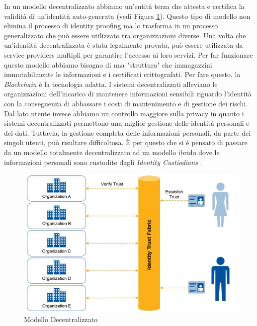 In un modello decentralizzato abbiamo un'entità terza che attesta e certifica la validità di un'identità auto-generata (vedi Figura \ref{img:decentralizzato}).
Questo tipo di modello non elimina il processo di identity proofing ma lo trasforma in un processo generalizzato che può essere utilizzato tra organizzazioni diverse.
Una volta che un'identità decentralizzata è stata legalmente provata, può essere utilizzata da service providers multipli per garantire l'accesso ai loro servizi.
Per far funzionare questo modello abbiamo bisogno di una "struttura" che immagazzini immutabilmente le informazioni e i certificati crittografati.  Per fare questo, la \textit{Blockchain} è la tecnologia adatta.
I sistemi decentralizzati alleviano le organizzazioni dell'incarico di mantenere informazioni sensibili riguardo l'identità con la conseguenza di abbassare i costi di mantenimento e di gestione dei rischi.
Dal lato utente invece abbiamo un controllo maggiore sulla privacy in quanto i sistemi decentralizzati permettono una miglior gestione delle identità personali e dei dati.
Tuttavia, la gestione completa delle informazioni personali, da parte dei singoli utenti, può risultare difficoltosa. È per questo che si è pensato di passare da un modello totalmente decentralizzato ad un modello ibrido dove le informazioni personali sono custodite dagli \textit{Identity Custiodians} \cite{ITF_gartner}.
\begin{figure}[!h]
	\centering
	\includegraphics[scale=0.50]{immagini/ITF_Decentralizzato}
	\caption{Modello Decentralizzato}
	\label{img:decentralizzato}
\end{figure}
